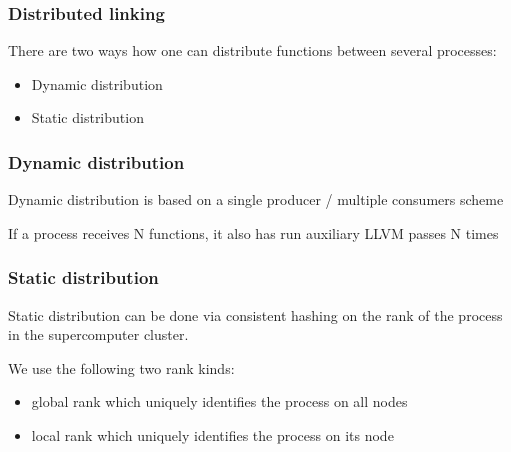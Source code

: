 
\begin{frame}
\frametitle{Distributed linking}
There are two ways how one can distribute functions between several processes:
	\begin{itemize}
		\item Dynamic distribution
		\item Static distribution
	\end{itemize}
\end{frame}


\begin{frame}
\frametitle{Dynamic distribution}
\begin{block}
	\centering
	Dynamic distribution is based on a single producer / multiple consumers scheme
\end{block}

\begin{block}
	\centering
	If a process receives N functions, it also has run auxiliary LLVM passes N times
\end{block}
\end{frame}


\begin{frame}
\frametitle{Static distribution}
\begin{block}
	\centering
	Static distribution can be done via consistent hashing on the rank of the process in the supercomputer cluster.
\end{block}
We use the following two rank kinds:
	\begin{itemize}
		\item global rank which uniquely identifies the process on all nodes
		\item local rank which uniquely identifies the process on its node
	\end{itemize}
\end{frame}

